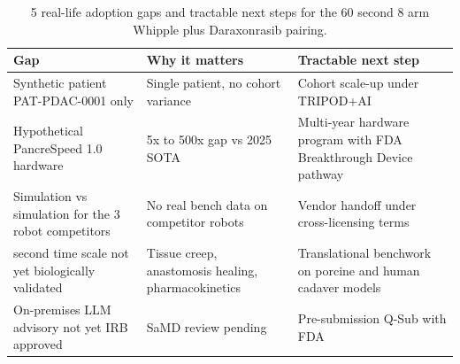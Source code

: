 \begin{table}[H]
\caption{5 real-life adoption gaps and tractable next steps for the 60 second 8 arm Whipple plus Daraxonrasib pairing.}
\label{tab:discussion-realworld}
\centering
\begin{tabular}{>{\raggedright\arraybackslash}p{4.0cm} >{\raggedright\arraybackslash}p{4.6cm} >{\raggedright\arraybackslash}p{4.6cm}}
\toprule
\textbf{Gap} & \textbf{Why it matters} & \textbf{Tractable next step} \\
\midrule
  Synthetic patient PAT-PDAC-0001 only & Single patient, no cohort variance & Cohort scale-up under TRIPOD+AI \cite{Collins2024TRIPODAI} \\
  Hypothetical PancreSpeed 1.0 hardware & 5x to 500x gap vs 2025 SOTA & Multi-year hardware program with FDA Breakthrough Device pathway \\
  Simulation vs simulation for the 3 robot competitors & No real bench data on competitor robots & Vendor handoff under cross-licensing terms \\
  60 second time scale not yet biologically validated & Tissue creep, anastomosis healing, pharmacokinetics & Translational benchwork on porcine and human cadaver models \\
  On-premises LLM advisory not yet IRB approved & SaMD review pending & Pre-submission Q-Sub with FDA \cite{fda-samd} \\
\bottomrule
\end{tabular}
\end{table}
